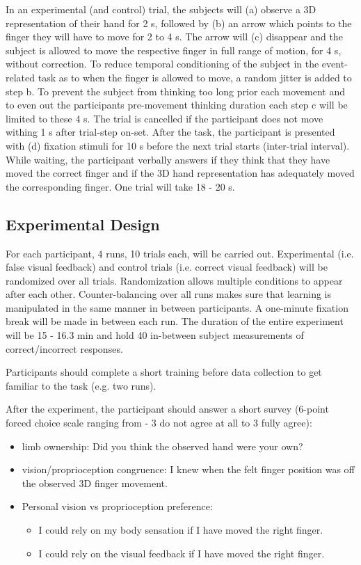 \documentclass[man]{apa7}
\begin{document}
In an experimental (and control) trial, the subjects will (a) observe a 3D representation of their hand for 2 s, followed by (b) an arrow which points to the finger they will have to move for 2 to 4 s. The arrow will (c) disappear and the subject is allowed to move the respective finger in full range of motion, for 4 s, without correction. To reduce temporal conditioning of the subject in the event-related task as to when the finger is allowed to move, a random jitter is added to step b. To prevent the subject from thinking too long prior each movement and to even out the participants pre-movement thinking duration each step c will be limited to these 4 s. The trial is cancelled if the participant does not move withing 1 s after trial-step on-set. After the task, the participant is presented with (d) fixation stimuli for 10 s before the next trial starts (inter-trial interval). While waiting, the participant verbally answers if they think that they have moved the correct finger and if the 3D hand representation has adequately moved the corresponding finger. One trial will take 18 - 20 s.

\subsection{Experimental Design}

For each participant, 4 runs, 10 trials each, will be carried out. Experimental (i.e. false visual feedback) and control trials (i.e. correct visual feedback) will be randomized over all trials. Randomization allows multiple conditions to appear after each other. Counter-balancing over all runs makes sure that learning is manipulated in the same manner in between participants. A one-minute fixation break will be made in between each run. The duration of the entire experiment will be 15 - 16.3 min and hold 40 in-between subject measurements of correct/incorrect responses.

Participants should complete a short training before data collection to get familiar to the task (e.g. two runs).

After the experiment, the participant should answer a short survey (6-point forced choice scale ranging from - 3 do not agree at all to 3 fully agree):
\begin{itemize}
    \item limb ownership: Did you think the observed hand were your own?
    \item vision/proprioception congruence: I knew when the felt finger position was off the observed 3D finger movement.
    \item Personal vision vs proprioception preference:
    \begin{itemize}
        \item I could rely on my body sensation if I have moved the right finger.
        \item I could rely on the visual feedback if I have moved the right finger.
    \end{itemize}
\end{itemize}
\end{document}
